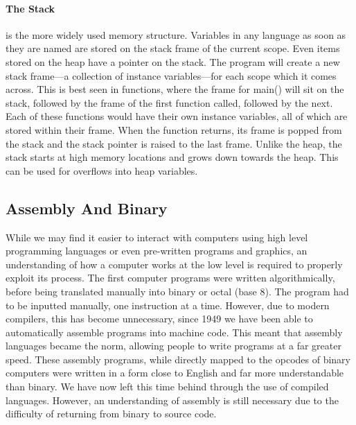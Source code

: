 \documentclass[a4paper,11pt]{article}
\begin{document}
					\paragraph{The Stack}
						is the more widely used memory structure. 
						Variables in any language as soon as they are named are stored on the stack frame of the current scope. 
						Even items stored on the heap have a pointer on the stack. 
						The program will create a new stack frame---a collection of instance variables---for each scope which it comes across. 
						This is best seen in functions, where the frame for main() will sit on the stack, followed by the frame of the first function called, followed by the next. 
						Each of these functions would have their own instance variables, all of which are stored within their frame. 
						When the function returns, its frame is popped from the stack and the stack pointer is raised to the last frame. 
						Unlike the heap, the stack starts at high memory locations and grows down towards the heap. 
						This can be used for overflows into heap variables. 

	\subsection{Assembly And Binary}
		While we may find it easier to interact with computers using high level programming languages or even pre-written programs and graphics, an understanding of how a computer works at the low level is required to properly exploit its process. 
		The first computer programs were written algorithmically, before being translated manually into binary or octal (base 8). 
		The program had to be inputted manually, one instruction at a time. 
		However, due to modern compilers, this has become unnecessary, since 1949 we have been able to automatically assemble programs into machine code. 
		This meant that assembly languages became the norm, allowing people to write programs at a far greater speed.
		These assembly programs, while directly mapped to the opcodes of binary computers were written in a form close to English and far more understandable than binary. 
		We have now left this time behind through the use of compiled languages. 
		However, an understanding of assembly is still necessary due to the difficulty of returning from binary to source code. 
\end{document}
